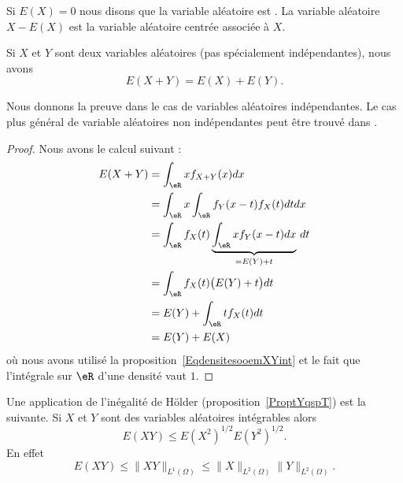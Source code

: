 \begin{definition}
    Si \( E(X)=0\) nous disons que la variable aléatoire est . La variable aléatoire \( X-E(X)\) est la variable aléatoire centrée associée à \( X\).
\end{definition}

\begin{proposition} \label{PropZBnsCgh}
    Si \( X\) et \( Y\) sont deux variables aléatoires (pas spécialement indépendantes), nous avons
    \begin{equation}
        E(X+Y)=E(X)+E(Y).
    \end{equation}
\end{proposition}

Nous donnons la preuve dans le cas de variables aléatoires indépendantes. Le cas plus général de variable aléatoires non indépendantes peut être trouvé dans \cite{Marazzi}.
\begin{proof}
    Nous avons le calcul suivant :
    \begin{subequations}
        \begin{align}
            E(X+Y)&=\int_{\eR}xf_{X+Y}(x)dx\\
            &=\int_{\eR}x\int_{\eR}f_Y(x-t)f_X(t)dtdx\\
            &=\int_{\eR}f_X(t)\underbrace{\int_{\eR}xf_Y(x-t)dx}_{=E(Y)+t}\,dt\\
            &=\int_{\eR}f_X(t)\big( E(Y)+t \big)dt\\
            &=E(Y)+\int_{\eR}tf_X(t)dt\\
            &=E(Y)+E(X)
        \end{align}
    \end{subequations}
    où nous avons utilisé la proposition~\ref{EqdensitesooemXYint} et le fait que l'intégrale sur \( \eR\) d'une densité vaut \( 1\).
\end{proof}

Une application de l'inégalité de Hölder (proposition~\ref{ProptYqspT}) est la suivante. Si \( X\) et \( Y\) sont des variables aléatoires intégrables alors
\begin{equation}
    E(XY)\leq E(X^2)^{1/2}E(Y^2)^{1/2}.
\end{equation}
En effet
\begin{equation}    \label{EqEXYleqXdYdNormHolder}
    E(XY)\leq \| XY \|_{L^1(\Omega)}\leq \| X \|_{L^2(\Omega)}\| Y \|_{L^2(\Omega)}.
\end{equation}

